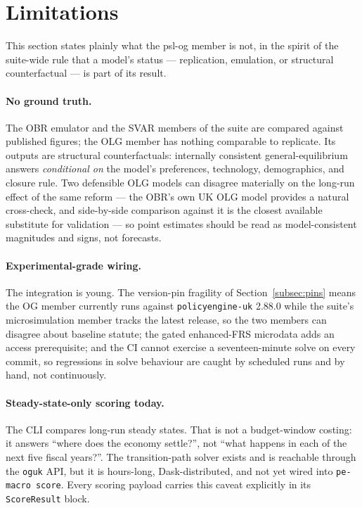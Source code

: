 \section{Limitations}
\label{sec:limitations}

This section states plainly what the psl-og member is not, in the spirit of the suite-wide rule that a model's status --- replication, emulation, or structural counterfactual --- is part of its result.

\paragraph{No ground truth.} The OBR emulator and the SVAR members of the suite are compared against published figures; the OLG member has nothing comparable to replicate. Its outputs are structural counterfactuals: internally consistent general-equilibrium answers \emph{conditional on} the model's preferences, technology, demographics, and closure rule. Two defensible OLG models can disagree materially on the long-run effect of the same reform --- the OBR's own UK OLG model \citep{OBR2025OLG} provides a natural cross-check, and side-by-side comparison against it is the closest available substitute for validation --- so point estimates should be read as model-consistent magnitudes and signs, not forecasts.

\paragraph{Experimental-grade wiring.} The integration is young. The version-pin fragility of Section~\ref{subsec:pins} means the OG member currently runs against \texttt{policyengine-uk} 2.88.0 while the suite's microsimulation member tracks the latest release, so the two members can disagree about baseline statute; the gated enhanced-FRS microdata adds an access prerequisite; and the CI cannot exercise a seventeen-minute solve on every commit, so regressions in solve behaviour are caught by scheduled runs and by hand, not continuously.

\paragraph{Steady-state-only scoring today.} The CLI compares long-run steady states. That is not a budget-window costing: it answers ``where does the economy settle?'', not ``what happens in each of the next five fiscal years?''. The transition-path solver exists and is reachable through the \texttt{oguk} API, but it is hours-long, Dask-distributed, and not yet wired into \texttt{pe-macro score}. Every scoring payload carries this caveat explicitly in its \texttt{ScoreResult} block.

